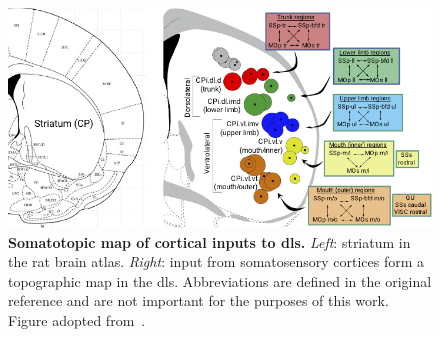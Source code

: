 \begin{figure}[bth!]
  \begin{center}
    \includegraphics[width=0.9\linewidth]{ch-intro/figures/StriatumInputMap}
    \caption[Somatotopic map of cortical inputs to \gls{dls}]
    {\textbf{Somatotopic map of cortical inputs to \gls{dls}.}
    \textit{Left}: striatum in the rat brain atlas.
    \textit{Right}: input from somatosensory cortices form a topographic map in the \gls{dls}.
    Abbreviations are defined in the original reference and are not important for the purposes of this work.
    Figure adopted from~\cite{Hintiryan2016NN}.
    }
    \label{fig:intro:InputMap}
  \end{center}
\end{figure}